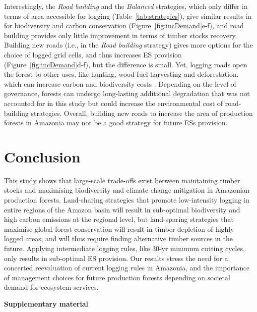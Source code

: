 \documentclass{article}
\newcommand{\beginsupplement}{%
        \setcounter{table}{0}
        \renewcommand{\thetable}{S\arabic{table}}%
        \setcounter{figure}{0}
        \renewcommand{\thefigure}{S\arabic{figure}}%
     }
\begin{document}
Interestingly, the \textit{Road building} and the \textit{Balanced} strategies, which only differ in terms of area accessible for logging (Table~\ref{tab:strategies}), give similar results in for biodiversity and carbon conservation (Figure~\ref{fig:incDemand}e-f), and road building provides only little improvement in terms of timber stocks recovery.
Building new roads (i.e., in the \textit{Road building} strategy) gives more options for the choice of logged grid cells, and thus increases ES provision (Figure~\ref{fig:incDemand}d-f), but the difference is small. 
Yet, logging roads open the forest to other uses, like hunting, wood-fuel harvesting and deforestation, which can increase carbon and biodiversity costs \cite{Laurance2009a}. Depending on the level of governance, forests can undergo long-lasting additional degradation that was not accounted for in this study but could increase the environmental cost of road-building strategies. Overall, building new roads to increase the area of production forests in Amazonia may not be a good strategy for future ESs provision. 

\section{Conclusion}

This study shows that large-scale trade-offs exist between maintaining timber stocks and maximising biodiversity and climate change mitigation in Amazonian production forests. Land-sharing strategies that promote low-intensity logging in entire regions of the Amazon basin will result in sub-optimal biodiversity and high carbon emissions at the regional level, but land-sparing strategies that maximise global forest conservation will result in timber depletion of highly logged areas, and will thus require finding alternative timber sources in the future. Applying intermediate logging rules, like 30-yr minimum cutting cycles, only results in sub-optimal ES provision. Our results stress the need for a concerted reevaluation of current logging rules in Amazonia, and the importance of management choices for future production forests depending on societal demand for ecosystem services. 

\clearpage





\onecolumn
\beginsupplement
\appendix
\begin{center}
    { \huge \textbf{Supplementary material}}
\end{center} 
\end{document}
